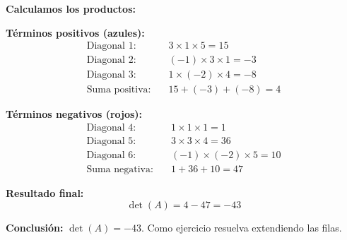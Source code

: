 \begin{example}
\begin{myproof}
\begin{center}
\end{center}

\textbf{Calculamos los productos:}

\textbf{Términos positivos (azules):}
\begin{align*}
\text{Diagonal 1:} &\quad 3 \times 1 \times 5 = 15 \\
\text{Diagonal 2:} &\quad (-1) \times 3 \times 1 = -3 \\
\text{Diagonal 3:} &\quad 1 \times (-2) \times 4 = -8 \\
\text{Suma positiva:} &\quad 15 + (-3) + (-8) = 4
\end{align*}

\textbf{Términos negativos (rojos):}
\begin{align*}
\text{Diagonal 4:} &\quad 1 \times 1 \times 1 = 1 \\
\text{Diagonal 5:} &\quad 3 \times 3 \times 4 = 36 \\
\text{Diagonal 6:} &\quad (-1) \times (-2) \times 5 = 10 \\
\text{Suma negativa:} &\quad 1 + 36 + 10 = 47
\end{align*}

\textbf{Resultado final:}
\[
\det(A) = 4 - 47 = -43
\]

\textbf{Conclusión:} $\det(A) = -43$. Como ejercicio resuelva extendiendo las filas.
\end{myproof}
\end{example}

